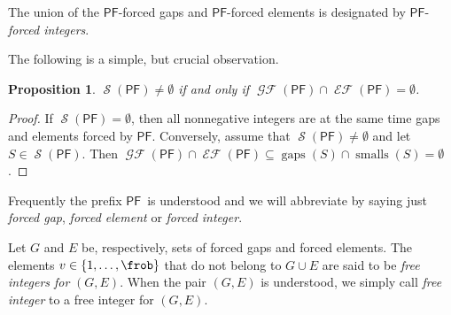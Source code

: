 \documentclass[11pt]{amsart}
\newtheorem{proposition}[theorem]{Proposition}
\theoremstyle{remark}
\begin{document}
The union of the {\ensuremath{\mathsf{PF}}}-forced gaps and {\ensuremath{\mathsf{PF}}}-forced elements is designated by {\ensuremath{\mathsf{PF}}}-\emph{forced integers}.

The following is a simple, but crucial observation.
\begin{proposition}\label{prop:intersection_gaps_elements}
$\operatorname{\mathcal{S}}({\ensuremath{\mathsf{PF}}})\ne \emptyset$ if and only if $\operatorname{\mathcal{GF}}({\ensuremath{\mathsf{PF}}})\cap \operatorname{\mathcal{EF}}({\ensuremath{\mathsf{PF}}})=\emptyset$.
\end{proposition}
\begin{proof}
If $\operatorname{\mathcal{S}}({\ensuremath{\mathsf{PF}}})= \emptyset$, then all nonnegative integers are at the same time gaps and elements forced by {\ensuremath{\mathsf{PF}}}. Conversely, assume that $\operatorname{\mathcal{S}}({\ensuremath{\mathsf{PF}}})\ne \emptyset$ and let $S\in \operatorname{\mathcal{S}}({\ensuremath{\mathsf{PF}}})$. Then $\operatorname{\mathcal{GF}}({\ensuremath{\mathsf{PF}}})\cap\operatorname{\mathcal{EF}}({\ensuremath{\mathsf{PF}}})\subseteq \operatorname{gaps}(S)\cap \operatorname{smalls}(S) = \emptyset$.
\end{proof}

Frequently the prefix {\ensuremath{\mathsf{PF}}}\ is understood and we will abbreviate by saying just \emph{forced gap}, \emph{forced element} or \emph{forced integer}. 

Let $G$ and $E$ be, respectively, sets of forced gaps and forced elements. The elements $v\in \{1,\ldots,\frob\}$ that do not belong to $G\cup E$ are said to be \emph{free integers for} $(G,E)$. When the pair $(G,E)$ is understood, we simply call \emph{free integer} to a free integer for $(G,E)$. 
\end{document}
